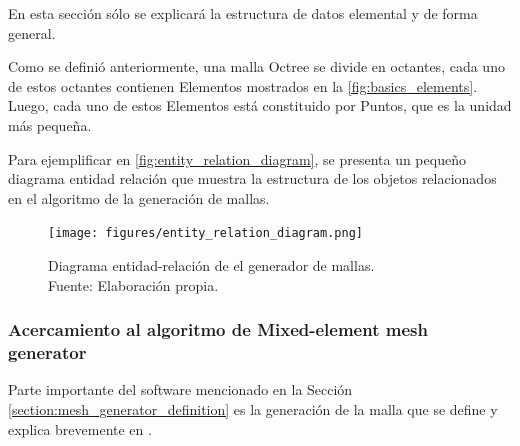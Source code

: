 En esta sección sólo se explicará la estructura de datos elemental y de forma general. 

Como se definió anteriormente, una malla Octree se divide en octantes, cada uno de estos octantes contienen Elementos mostrados en la \autoref{fig:basics_elements}.  Luego, cada uno de estos Elementos está constituido por Puntos, que es la unidad más pequeña.

Para ejemplificar en \autoref{fig:entity_relation_diagram}, se presenta un pequeño diagrama entidad relación que muestra la estructura de los objetos relacionados en el algoritmo de la generación de mallas.


\begin{figure}[!ht]
	\centering
	\texttt{[image: figures/entity\_relation\_diagram.png]}
	\caption{Diagrama entidad-relación de el generador de mallas.\\  Fuente: Elaboración propia.}
	\label{fig:entity_relation_diagram}
\end{figure}

\subsubsection{Acercamiento al algoritmo de Mixed-element mesh generator}

Parte importante del software mencionado en la Sección \ref{section:mesh_generator_definition} es la generación de la malla que se define y explica brevemente en \cite{daines2018repairing}.


